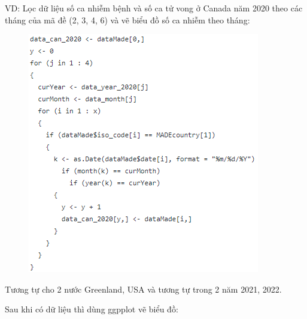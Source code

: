 \documentclass[a4paper]{article}
\theoremstyle{definition}
\begin{document}
\begin{enumerate}[i)]
\begin{enumerate}[1]
	VD: Lọc dữ liệu số ca nhiễm bệnh và số ca tử vong ở Canada năm 2020 theo các tháng của mã đề (2, 3, 4, 6) và vẽ biểu đồ số ca nhiễm theo tháng:
	            \begin{figure}[H]
				    \centering
				    \includegraphics{images/5.0.2.png}
		    	\end{figure}
    Tương tự cho 2 nước Greenland, USA và tương tự trong 2 năm 2021, 2022.
    
    Sau khi có dữ liệu thì dùng ggpplot vẽ biểu đồ:
    

\end{enumerate}
\end{enumerate}
\end{document}
